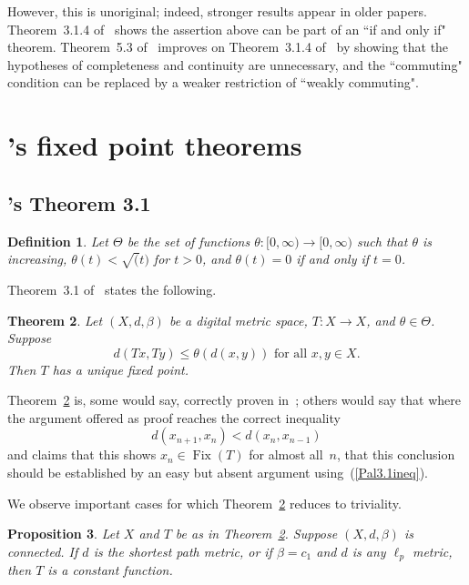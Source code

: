 \documentclass{article}
\newtheorem{thm}{Theorem}
\newtheorem{prop}[thm]{Proposition}
\newtheorem{definition}[thm]{Definition}
\numberwithin{thm}{section}
\DeclareMathOperator{\Fix}{Fix}
\begin{document}
However, this is unoriginal; indeed,
stronger results appear in older papers.
Theorem~3.1.4 of~\cite{RaniEtal} 
shows the
assertion above can be part 
of an ``if and only if" theorem.
Theorem~5.3 of~\cite{BxFPsets2}
improves on Theorem~3.1.4 of~\cite{RaniEtal}
by showing that the
hypotheses of completeness and continuity
are unnecessary, and the ``commuting" condition can
be replaced by a weaker restriction of ``weakly commuting".

\section{\cite{Pal}'s fixed point theorems}
\subsection{\cite{Pal}'s Theorem 3.1}
\begin{definition}
    {\rm \cite{GuptaEtal}}
    Let $\Theta$ be
    the set of     functions
    $\theta: [0,\infty) \to [0,\infty)$
    such that $\theta$ is
    increasing,
    $\theta(t) < \sqrt(t)$ for
    $t > 0$, and
    $\theta(t)=0$
    if and only if $t=0$.
\end{definition}

Theorem~3.1 of~\cite{Pal}
states the following.

\begin{thm}
\label{Pal3.1}
    Let $(X,d,\beta)$ be a digital
    metric space, $T: X \to X$,
    and $\theta \in \Theta$.
    Suppose 
    \begin{equation}
    \label{Pal3.1ineq}
        d(Tx,Ty) \le \theta(d(x,y)) \mbox{ for all
    $x,y \in X$.}
    \end{equation}  
    Then $T$ has a unique fixed point.
\end{thm}

Theorem~\ref{Pal3.1} is, some would say, correctly
proven in~\cite{Pal}; others would say that where
the argument offered as proof reaches the
correct inequality 
\[ d(x_{n+1},x_n) < d(x_n, x_{n-1})\]
and claims that this shows $x_n \in \Fix(T)$ for almost
all~$n$, that this conclusion should be established by
an easy but absent argument using~(\ref{Pal3.1ineq}).

We observe important cases
for which Theorem~\ref{Pal3.1} reduces to
triviality.

\begin{prop}
    Let $X$ and $T$ be as in
    Theorem~\ref{Pal3.1}. Suppose $(X,d,\beta)$
    is connected.
    If $d$ is the
    shortest path
    metric, or if
    $\beta=c_1$ and $d$ is any
    $\ell_p$ metric, then
    $T$ is a constant function.
\end{prop}
\end{document}
